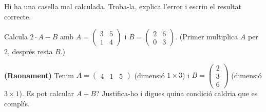 \begin{exercicis}
\begin{exlist}
        Hi ha una casella mal calculada. Troba-la, explica l'error i escriu el
        resultat correcte.
  \item Calcula $2\cdot A - B$ amb
        $A=\begin{pmatrix} 3 & 5 \\ 1 & 4 \end{pmatrix}$ i
        $B=\begin{pmatrix} 2 & 6 \\ 0 & 3 \end{pmatrix}$.
        (Primer multiplica $A$ per $2$, després resta $B$.)
  \item \textbf{(Raonament)} Tenim
        $A=\begin{pmatrix} 4 & 1 & 5 \end{pmatrix}$ (dimensió $1\times 3$) i
        $B=\begin{pmatrix} 2 \\ 3 \\ 6 \end{pmatrix}$ (dimensió $3\times 1$).
        Es pot calcular $A+B$? Justifica-ho i digues quina condició caldria que
        es complís.
\end{exlist}
\end{exercicis}

